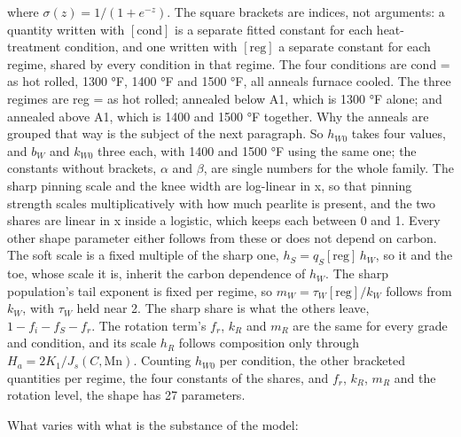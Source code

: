 \documentclass[
  11pt,
]{article}
\begin{document}
where \(\sigma(z) = 1/(1+e^{-z})\). The square brackets are indices, not arguments: a quantity written with \([\mathrm{cond}]\) is a separate fitted constant for each heat-treatment condition, and one written with \([\mathrm{reg}]\) a separate constant for each regime, shared by every condition in that regime. The four conditions are cond = as hot rolled, 1300 °F, 1400 °F and 1500 °F, all anneals furnace cooled. The three regimes are reg = as hot rolled; annealed below A1, which is 1300 °F alone; and annealed above A1, which is 1400 and 1500 °F together. Why the anneals are grouped that way is the subject of the next paragraph. So \(h_{W0}\) takes four values, and \(b_W\) and \(k_{W0}\) three each, with 1400 and 1500 °F using the same one; the constants without brackets, \(\alpha\) and \(\beta\), are single numbers for the whole family. The sharp pinning scale and the knee width are log-linear in x, so that pinning strength scales multiplicatively with how much pearlite is present, and the two shares are linear in x inside a logistic, which keeps each between 0 and 1. Every other shape parameter either follows from these or does not depend on carbon. The soft scale is a fixed multiple of the sharp one, \(h_S = q_S[\mathrm{reg}]\,h_W\), so it and the toe, whose scale it is, inherit the carbon dependence of \(h_W\). The sharp population's tail exponent is fixed per regime, so \(m_W = \tau_W[\mathrm{reg}]/k_W\) follows from \(k_W\), with \(\tau_W\) held near 2. The sharp share is what the others leave, \(1 - f_i - f_S - f_r\). The rotation term's \(f_r\), \(k_R\) and \(m_R\) are the same for every grade and condition, and its scale \(h_R\) follows composition only through \(H_a = 2K_1/J_s(C,\mathrm{Mn})\). Counting \(h_{W0}\) per condition, the other bracketed quantities per regime, the four constants of the shares, and \(f_r\), \(k_R\), \(m_R\) and the rotation level, the shape has 27 parameters.

What varies with what is the substance of the model:
\end{document}
